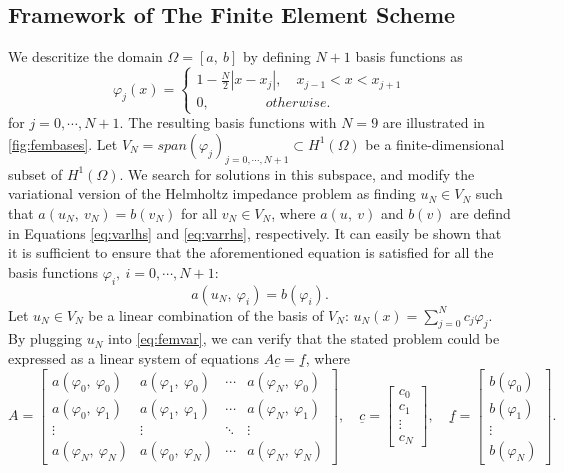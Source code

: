 \subsection{Framework of The Finite Element Scheme}\label{sec:femframework}
We descritize the domain $\Omega=[a,\:b]$ by defining $N+1$ basis functions as
\begin{equation}
    \label{eq:fembasisfuncs}
    \varphi_j(x) = \left\{\begin{matrix}
        1 - \frac{N}{2}|x - x_j|, \quad x_{j-1} < x < x_{j+1}
        \\
        0, \qquad \qquad otherwise.
        \end{matrix}\right.
\end{equation}
for $j = 0, \cdots, N+1$. The resulting basis functions with $N=9$ are illustrated in \autoref{fig:fembases}. Let $V_N = span(\varphi_j)_{j=0, \cdots, N+1} \subset H^{1}(\Omega)$ be a finite-dimensional subset of $H^{1}(\Omega)$. We search for solutions in this subspace, and modify the variational version of the Helmholtz impedance problem as finding $u_N \in V_N$ such that $a(u_N,\:v_N) = b(v_N)$ for all $v_N \in V_N$, where $a(u,\:v)$ and $b(v)$ are defind in Equations \ref{eq:varlhs} and \ref{eq:varrhs}, respectively. It can easily be shown that it is sufficient to ensure that the aforementioned equation is satisfied for all the basis functions $\varphi_i,\:i=0, \cdots, N+1$:
\begin{equation}
    \label{eq:femvar}
    a(u_N,\:\varphi_i) = b(\varphi_i).
\end{equation}
Let $u_N \in V_N$ be a linear combination of the basis of $V_N$: $u_N(x) = \sum_{j=0}^{N}{c_j\varphi_j}$. By plugging $u_N$ into \autoref{eq:femvar}, we can verify that the stated problem could be expressed as a linear system of equations $A\underline{c}=\underline{f}$, where
\begin{equation}
    \label{eq:femcoeffs}
    A = \begin{bmatrix}
        a(\varphi_0,\:\varphi_0) & a(\varphi_1,\:\varphi_0) & \cdots & a(\varphi_N,\:\varphi_0) \\
        a(\varphi_0,\:\varphi_1) & a(\varphi_1,\:\varphi_1) & \cdots & a(\varphi_N,\:\varphi_1) \\
        \vdots & \vdots & \ddots & \vdots \\
        a(\varphi_N,\:\varphi_N) & a(\varphi_0,\:\varphi_N) & \cdots & a(\varphi_N,\:\varphi_N)
        \end{bmatrix},
        \quad
        \underline{c} = \begin{bmatrix}
        c_0\\
        c_1\\
        \vdots\\
        c_N
        \end{bmatrix},
        \quad
        \underline{f} = \begin{bmatrix}
        b(\varphi_0)\\
        b(\varphi_1)\\
        \vdots\\
        b(\varphi_N)
        \end{bmatrix}.
\end{equation}
